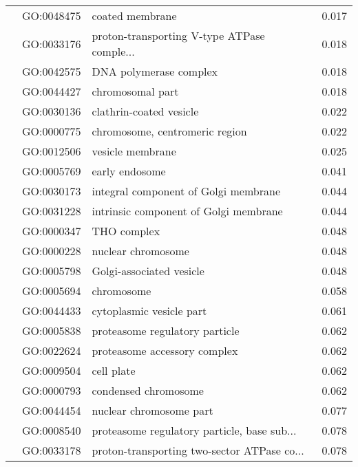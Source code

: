 \begin{longtable}{lllr}
   & GO:0048475 &                              coated membrane &         0.017 \\
   & GO:0033176 &  proton-transporting V-type ATPase comple... &         0.018 \\
   & GO:0042575 &                       DNA polymerase complex &         0.018 \\
   & GO:0044427 &                             chromosomal part &         0.018 \\
   & GO:0030136 &                      clathrin-coated vesicle &         0.022 \\
   & GO:0000775 &               chromosome, centromeric region &         0.022 \\
   & GO:0012506 &                             vesicle membrane &         0.025 \\
   & GO:0005769 &                               early endosome &         0.041 \\
   & GO:0030173 &         integral component of Golgi membrane &         0.044 \\
   & GO:0031228 &        intrinsic component of Golgi membrane &         0.044 \\
   & GO:0000347 &                                  THO complex &         0.048 \\
   & GO:0000228 &                           nuclear chromosome &         0.048 \\
   & GO:0005798 &                     Golgi-associated vesicle &         0.048 \\
   & GO:0005694 &                                   chromosome &         0.058 \\
   & GO:0044433 &                     cytoplasmic vesicle part &         0.061 \\
   & GO:0005838 &               proteasome regulatory particle &         0.062 \\
   & GO:0022624 &                 proteasome accessory complex &         0.062 \\
   & GO:0009504 &                                   cell plate &         0.062 \\
   & GO:0000793 &                         condensed chromosome &         0.062 \\
   & GO:0044454 &                      nuclear chromosome part &         0.077 \\
   & GO:0008540 &  proteasome regulatory particle, base sub... &         0.078 \\
   & GO:0033178 &  proton-transporting two-sector ATPase co... &         0.078 \\

\end{longtable}

